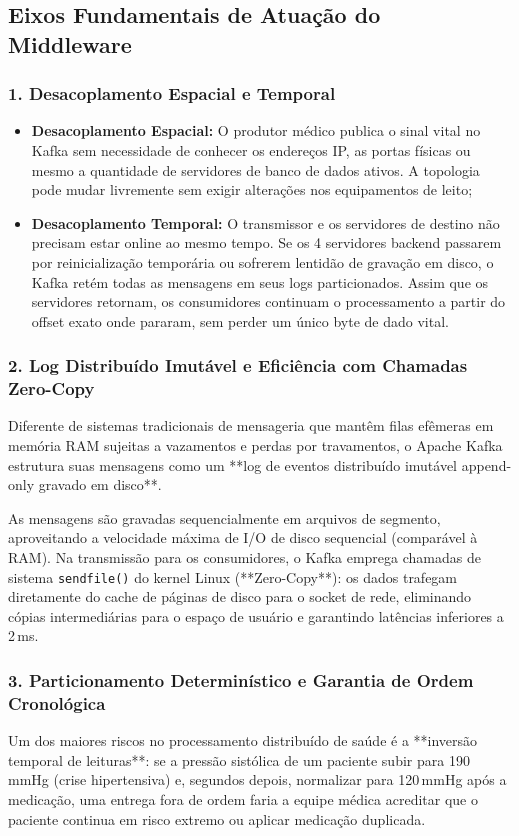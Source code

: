 \documentclass[12pt,a4paper]{article}
\begin{document}
\subsection{Eixos Fundamentais de Atuação do Middleware}

\subsubsection{1. Desacoplamento Espacial e Temporal}
\begin{itemize}
	\item \textbf{Desacoplamento Espacial:} O produtor médico publica o sinal vital no Kafka sem necessidade de conhecer os endereços IP, as portas físicas ou mesmo a quantidade de servidores de banco de dados ativos. A topologia pode mudar livremente sem exigir alterações nos equipamentos de leito;
	\item \textbf{Desacoplamento Temporal:} O transmissor e os servidores de destino não precisam estar online ao mesmo tempo. Se os 4 servidores backend passarem por reinicialização temporária ou sofrerem lentidão de gravação em disco, o Kafka retém todas as mensagens em seus logs particionados. Assim que os servidores retornam, os consumidores continuam o processamento a partir do offset exato onde pararam, sem perder um único byte de dado vital.
\end{itemize}

\subsubsection{2. Log Distribuído Imutável e Eficiência com Chamadas Zero-Copy}
Diferente de sistemas tradicionais de mensageria que mantêm filas efêmeras em memória RAM sujeitas a vazamentos e perdas por travamentos, o Apache Kafka estrutura suas mensagens como um **log de eventos distribuído imutável append-only gravado em disco**.

As mensagens são gravadas sequencialmente em arquivos de segmento, aproveitando a velocidade máxima de I/O de disco sequencial (comparável à RAM). Na transmissão para os consumidores, o Kafka emprega chamadas de sistema \texttt{sendfile()} do kernel Linux (**Zero-Copy**): os dados trafegam diretamente do cache de páginas de disco para o socket de rede, eliminando cópias intermediárias para o espaço de usuário e garantindo latências inferiores a 2\,ms.

\subsubsection{3. Particionamento Determinístico e Garantia de Ordem Cronológica}
Um dos maiores riscos no processamento distribuído de saúde é a **inversão temporal de leituras**: se a pressão sistólica de um paciente subir para 190\,mmHg (crise hipertensiva) e, segundos depois, normalizar para 120\,mmHg após a medicação, uma entrega fora de ordem faria a equipe médica acreditar que o paciente continua em risco extremo ou aplicar medicação duplicada.
\end{document}
